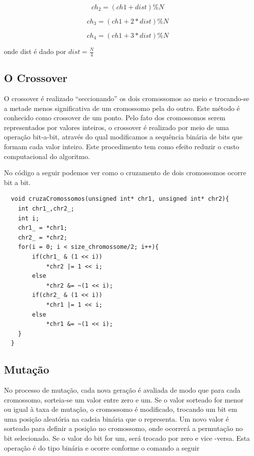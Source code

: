 \documentclass[
    12pt,               %
    oneside,%
    a4paper,            %
    english,            %
    french,             %
    spanish,            %
    brazil,             %
    ]{abntex2}
\begin{document}
  \begin{equation}
    ch_2 = (ch1 + dist) \% N
    \label{eq:chr2_roleta}
  \end{equation}
  
  \begin{equation}
    ch_3 = (ch1 + 2*dist)\% N
    \label{eq:chr3_roleta}
  \end{equation}
  
  \begin{equation}
    ch_4 = (ch1 + 3*dist) \% N
    \label{eq:chr4_roleta}
  \end{equation}
 
  onde dist é dado por $dist = \frac{N}{4}$


\subsection{O Crossover}

  O crossover é realizado  “seccionando” os dois cromossomos ao meio e trocando-se a metade menos significativa de um cromossomo pela do outro. Este método é conhecido como crossover de um ponto. Pelo fato dos cromossomos serem representados por valores inteiros, o crossover é realizado por meio de uma operação bit-a-bit, através do qual modificamos a sequência binária de bits que formam cada valor inteiro. Este procedimento tem como efeito reduzir o custo computacional do algoritmo.

  No código a seguir podemos ver como o cruzamento de dois cromossomos ocorre bit a bit.

  \begin{verbatim}
  void cruzaCromossomos(unsigned int* chr1, unsigned int* chr2){
    int chr1_,chr2_;
    int i;
    chr1_ = *chr1;
    chr2_ = *chr2;
    for(i = 0; i < size_chromossome/2; i++){
        if(chr1_ & (1 << i))
            *chr2 |= 1 << i;
        else
            *chr2 &= ~(1 << i);
        if(chr2_ & (1 << i))
            *chr1 |= 1 << i;
        else
            *chr1 &= ~(1 << i);
    }
  }

  \end{verbatim}

\subsection{Mutação}

  No processo de mutação, cada nova geração é avaliada de modo que para cada cromossomo, sorteia-se um valor entre zero e um. Se o valor sorteado for menor ou igual à taxa de mutação, o cromossomo é modificado, trocando um bit em uma posição aleatória na cadeia binária que o representa.
  Um novo valor é sorteado para definir a posição no cromossomo, onde ocorrerá a permutação no bit selecionado. Se o valor do bit for um, será trocado por zero e vice -versa. Esta operação é do tipo binária e ocorre conforme o comando a seguir
  
\end{document}
